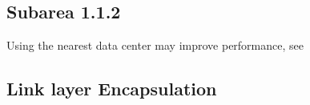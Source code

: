 \subsection{Subarea 1.1.2}
Using the nearest data center may improve performance, see \cite{bogdanov_nearest_2015}


\subsection{Link layer Encapsulation}
\label{sec:llencap}








